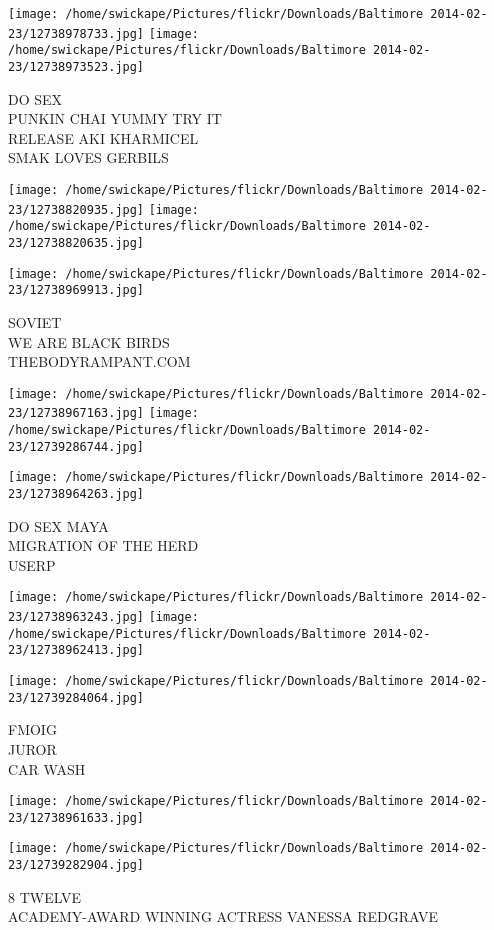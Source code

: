 \documentclass[10pt,letterpaper]{article}
\begin{document}
\texttt{[image: /home/swickape/Pictures/flickr/Downloads/Baltimore 2014-02-23/12738978733.jpg]}
\texttt{[image: /home/swickape/Pictures/flickr/Downloads/Baltimore 2014-02-23/12738973523.jpg]}

DO SEX\\
PUNKIN CHAI YUMMY TRY IT\\
RELEASE AKI KHARMICEL\\
SMAK LOVES GERBILS
\pagebreak

\texttt{[image: /home/swickape/Pictures/flickr/Downloads/Baltimore 2014-02-23/12738820935.jpg]}
\texttt{[image: /home/swickape/Pictures/flickr/Downloads/Baltimore 2014-02-23/12738820635.jpg]}

\vspace{0.25in}
\texttt{[image: /home/swickape/Pictures/flickr/Downloads/Baltimore 2014-02-23/12738969913.jpg]}

SOVIET\\
WE ARE BLACK BIRDS\\
THEBODYRAMPANT.COM
\pagebreak

\texttt{[image: /home/swickape/Pictures/flickr/Downloads/Baltimore 2014-02-23/12738967163.jpg]}
\texttt{[image: /home/swickape/Pictures/flickr/Downloads/Baltimore 2014-02-23/12739286744.jpg]}

\vspace{0.25in}
\texttt{[image: /home/swickape/Pictures/flickr/Downloads/Baltimore 2014-02-23/12738964263.jpg]}

DO SEX MAYA\\
MIGRATION OF THE HERD\\
USERP
\pagebreak

\texttt{[image: /home/swickape/Pictures/flickr/Downloads/Baltimore 2014-02-23/12738963243.jpg]}
\texttt{[image: /home/swickape/Pictures/flickr/Downloads/Baltimore 2014-02-23/12738962413.jpg]}

\texttt{[image: /home/swickape/Pictures/flickr/Downloads/Baltimore 2014-02-23/12739284064.jpg]}

FMOIG\\
JUROR\\
CAR WASH
\pagebreak

\texttt{[image: /home/swickape/Pictures/flickr/Downloads/Baltimore 2014-02-23/12738961633.jpg]}

\vspace{0.25in}
\texttt{[image: /home/swickape/Pictures/flickr/Downloads/Baltimore 2014-02-23/12739282904.jpg]}

8 TWELVE\\
ACADEMY{-}AWARD WINNING ACTRESS VANESSA REDGRAVE
\pagebreak
\end{document}
